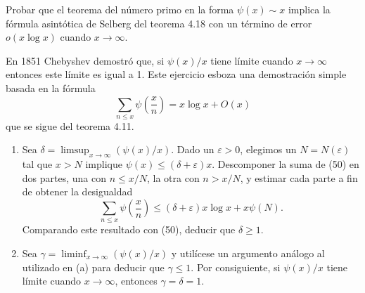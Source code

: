\documentclass[12pt,a4paper]{book}
\begin{document}
    \begin{ejercicio}
        Probar que el teorema del número primo en la forma $\psi(x)\sim x$ implica la
        fórmula asintótica de Selberg del teorema 4.18 con un término de error
        $o(x\log x)$ cuando $x\to\infty$.
    \end{ejercicio}

    \begin{ejercicio}
        En 1851 Chebyshev \cite{chebyshev1851} demostró que, si $\psi(x)/x$ tiene límite cuando
        $x\to\infty$ entonces este límite es igual a 1. Este ejercicio esboza una
        demostración simple basada en la fórmula
        \begin{equation}
            \sum_{n\leq x}\psi\left(\frac{x}{n}\right)=x\log x+O(x)
        \end{equation}
        que se sigue del teorema 4.11.
        \begin{enumerate}
            \item[(a)] Sea $\delta=\limsup_{x\to\infty}(\psi(x)/x)$. Dado un
            $\varepsilon>0$, elegimos un $N=N(\varepsilon)$ tal que $x>N$ implique
            $\psi(x)\leq(\delta+\varepsilon)x$. Descomponer la suma de (50) en dos
            partes, una con $n\leq x/N$, la otra con $n>x/N$, y estimar cada parte a
            fin de obtener la desigualdad
            \begin{equation*}
                \sum_{n\leq x}\psi\left(\frac{x}{n}\right)\leq(\delta+\varepsilon)x\log x+x\psi(N).
            \end{equation*}
            Comparando este resultado con (50), deducir que $\delta\geq1$.
            \item[(b)] Sea $\gamma=\liminf_{x\to\infty}(\psi(x)/x)$ y utilícese un
            argumento análogo al utilizado en (a) para deducir que $\gamma\leq1$. Por
            consiguiente, si $\psi(x)/x$ tiene límite cuando $x\to\infty$, entonces
            $\gamma=\delta=1$.
        \end{enumerate}
    \end{ejercicio}
\end{document}
